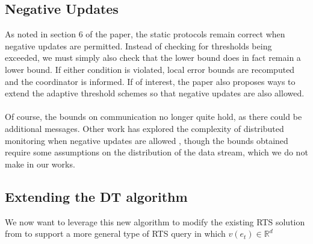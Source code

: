 \documentclass{article}
\begin{document}
\subsection*{Negative Updates}
As noted in section 6 of the paper, the static protocols remain correct when negative updates are permitted. Instead of checking for thresholds being exceeded, we must simply also check that the lower bound does in fact remain a lower bound. If either condition is violated, local error bounds are recomputed and the coordinator is informed. If of interest, the paper also proposes ways to extend the adaptive threshold schemes so that negative updates are also allowed. \\
\\
Of course, the bounds on communication no longer quite hold, as there could be additional messages. Other work has explored the complexity of distributed monitoring when negative updates are allowed \cite{DTwithoutmonotonicity}, though the bounds obtained require some assumptions on the distribution of the data stream, which we do not make in our works.

\newpage
\subsection*{Extending the DT algorithm}

We now want to leverage this new algorithm to modify the existing RTS solution from \cite{Gan2016} to support a more general type of RTS query in which $v(e_t) \in \mathbb{R}^d$

\newpage

\end{document}
